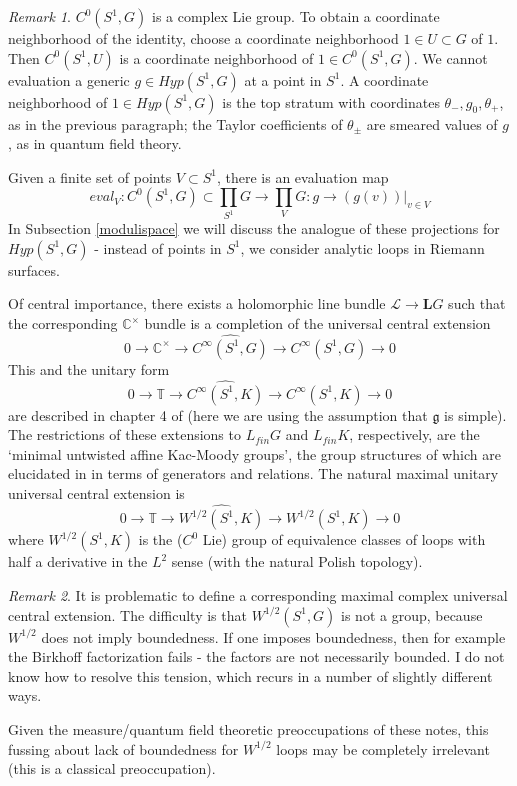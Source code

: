 \documentclass{amsart}
\theoremstyle{conjecture}
\theoremstyle{definition}
\theoremstyle{question}
\theoremstyle{questions}
\theoremstyle{remark}
\newtheorem*{remark}{Remark}
\theoremstyle{remarks}
\theoremstyle{example}
\numberwithin{equation}{section}
\begin{document}
\begin{remark} $C^0(S^1,G)$ is a complex Lie group. To obtain a coordinate neighborhood of the identity,
choose a coordinate neighborhood $1\in U\subset G$ of $1$. Then $C^0(S^1,U)$ is a coordinate neighborhood
of $1\in C^0(S^1,G)$. We cannot evaluation a generic $g\in Hyp(S^1,G)$ at a point in $S^1$. A
coordinate neighborhood
of $1\in Hyp(S^1,G)$ is the top stratum with coordinates $\theta_{ -},g_0,\theta_{+}$, as in the previous paragraph;
the Taylor coefficients of $\theta_{\pm}$ are smeared values of $g$, as in quantum field theory.

Given a finite set of points $V\subset S^1$, there is an evaluation map
$$eval_V:C^0(S^1,G)\subset \prod_{S^1}G \to \prod_V G: g \to (g(v))|_{v\in V}$$
In Subsection \ref{modulispace} we will discuss the analogue of these projections for $Hyp(S^1,G)$ - instead
of points in $S^1$, we consider analytic loops in Riemann surfaces.
\end{remark}


Of central importance, there exists a holomorphic line bundle
$\mathcal L \to \mathbf L G$ such that the corresponding $\mathbb C^{\times}$ bundle
is a completion of the universal central extension
$$0\to \mathbb C^{\times} \to \widehat{C^{\infty}(S^1,G)} \to C^{\infty}(S^1,G)\to 0$$
This and the unitary form
$$0\to \mathbb T \to \widehat{C^{\infty}(S^1,K)} \to C^{\infty}(S^1,K)\to 0$$
are described in chapter 4 of \cite{PS} (here we are using the assumption that $\mathfrak g$ is simple).
The restrictions of these extensions to $L_{fin}G$ and $L_{fin}K$, respectively, are
the `minimal untwisted affine Kac-Moody groups', the group structures of which
are elucidated in \cite{KP} in terms of generators and relations. The natural maximal unitary
universal central extension is
$$0\to \mathbb T \to \widehat{W^{1/2}(S^1,K)} \to W^{1/2}(S^1,K)\to 0$$
where $W^{1/2}(S^1,K)$ is the ($C^0$ Lie) group of equivalence classes of loops with half a derivative
in the $L^2$ sense (with the natural Polish topology).

\begin{remark} It is problematic to define a corresponding maximal complex universal central extension.
The difficulty is that $W^{1/2}(S^1,G)$ is not a group, because $W^{1/2}$ does not imply boundedness. If one
imposes boundedness, then for example the Birkhoff factorization fails - the factors are not necessarily
bounded. I do not know how to resolve this tension, which recurs in a number of slightly different ways.

Given the measure/quantum field theoretic preoccupations of these notes, this fussing about lack of boundedness for $W^{1/2}$
loops may be completely irrelevant (this is a classical preoccupation).
\end{remark}
\end{document}
